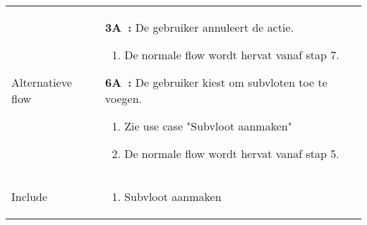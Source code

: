 \documentclass{article}
\begin{document}
\begin{tabularx}{\textwidth}{ | l | X |}
 Alternatieve flow & 
 
 \textbf{3A~:} De gebruiker annuleert de actie. 
 	\begin{enumerate}[label=\alph*]
        \item De normale flow wordt hervat vanaf stap 7.
 	\end{enumerate}
 \textbf{6A~:} De gebruiker kiest om subvloten toe te voegen. 
 	\begin{enumerate}[label=\alph*]
    	\item Zie use case "Subvloot aanmaken"
        \item De normale flow wordt hervat vanaf stap 5.
 	\end{enumerate}
    \\ 
 Include &
 \begin{enumerate}
 \item Subvloot aanmaken
 \end{enumerate}\\
 \hline
 
 \hline
\end{tabularx}
\newpage
\end{document}
